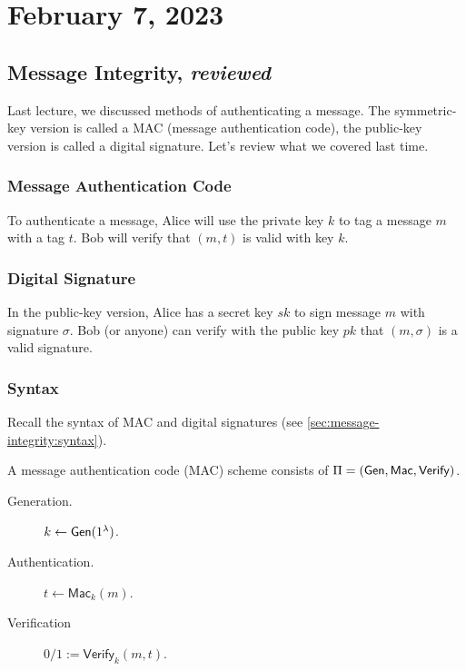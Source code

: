\section{February 7, 2023}
\label{20230207}
\subsection{Message Integrity, \emph{reviewed}}

Last lecture, we discussed methods of authenticating a message. The symmetric-key version is called a MAC (message authentication code), the public-key version is called a digital signature. Let's review what we covered last time.

\subsubsection{Message Authentication Code}
To authenticate a message, Alice will use the private key $k$ to tag a message $m$ with a tag $t$. Bob will verify that $(m, t)$ is valid with key $k$.


\subsubsection{Digital Signature}
In the public-key version, Alice has a secret key $sk$ to sign message $m$ with signature $\sigma$. Bob (or anyone) can verify with the public key $pk$ that $(m, \sigma)$ is a valid signature.


\subsubsection{Syntax}
Recall the syntax of MAC and digital signatures (see \cref{sec:message-integrity:syntax}).

A message authentication code (MAC) scheme consists of $\Pi = (\operatorname{\mathsf{Gen}}, \mathsf{Mac}, \mathsf{Verify})$.
\begin{description}
    \item[Generation.] $k\leftarrow \operatorname{\mathsf{Gen}}(1^\lambda)$.
    \item[Authentication.] $t \leftarrow \mathsf{Mac}_k(m)$.
    \item[Verification] $0/1 := \mathsf{Verify}_k(m, t)$.
\end{description}

